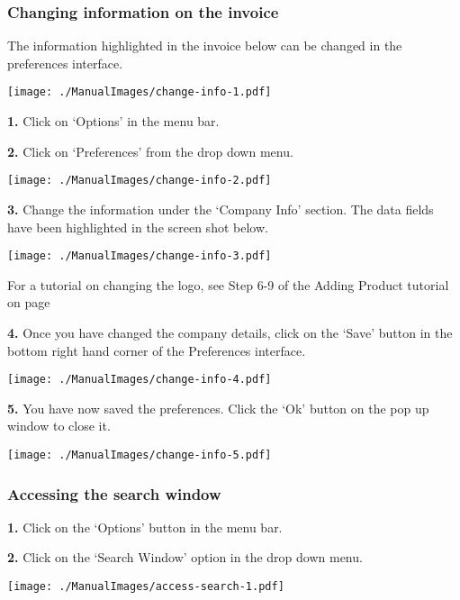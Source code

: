 \pagebreak
\subsubsection{Changing information on the invoice}
\label{fig:Changing information on the invoice}

The information highlighted in the invoice below can be changed in the preferences interface.

\texttt{[image: ./ManualImages/change-info-1.pdf]}

\pagebreak

\textbf{1.} Click on `Options' in the menu bar.

\textbf{2.} Click on `Preferences' from the drop down menu.

\texttt{[image: ./ManualImages/change-info-2.pdf]}

\pagebreak

\textbf{3.} Change the information under the `Company Info' section. The data fields have been highlighted in the screen shot below.

\texttt{[image: ./ManualImages/change-info-3.pdf]}

For a tutorial on changing the logo, see Step 6-9 of the Adding Product tutorial on page \pageref{fig:Adding a Product to the system}

\pagebreak

\textbf{4.} Once you have changed the company details, click on the `Save' button in the bottom right hand corner of the Preferences interface.

\texttt{[image: ./ManualImages/change-info-4.pdf]}

\pagebreak

\textbf{5.} You have now saved the preferences. Click the `Ok' button on the pop up window to close it.

\texttt{[image: ./ManualImages/change-info-5.pdf]}

\pagebreak
\subsubsection{Accessing the search window}
\label{fig:Accessing the search window}

\textbf{1.} Click on the `Options' button in the menu bar.

\textbf{2.} Click on the `Search Window' option in the drop down menu.

\texttt{[image: ./ManualImages/access-search-1.pdf]}

